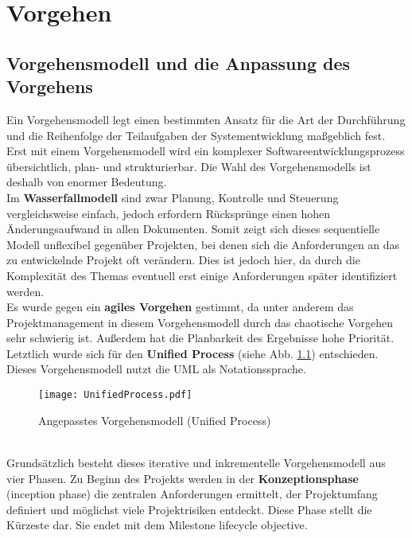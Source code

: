 \documentclass[../review_1.tex]{subfiles}
\begin{document}
\chapter{Vorgehen}\thispagestyle{fancy}
\section{Vorgehensmodell und die Anpassung des Vorgehens}
Ein Vorgehensmodell legt einen bestimmten Ansatz für die Art der Durchführung und die Reihenfolge der Teilaufgaben der Systementwicklung maßgeblich fest. Erst mit einem Vorgehensmodell wird ein komplexer Softwareentwicklungsprozess übersichtlich, plan- und strukturierbar. Die Wahl des Vorgehensmodells ist deshalb von enormer Bedeutung.\\
Im \textbf{Wasserfallmodell} sind zwar Planung, Kontrolle und Steuerung vergleichsweise einfach, jedoch erfordern Rücksprünge einen hohen Änderungsaufwand in allen Dokumenten. Somit zeigt sich dieses sequentielle Modell unflexibel gegenüber Projekten, bei denen sich die Anforderungen an das zu entwickelnde Projekt oft verändern. Dies ist jedoch hier, da durch die Komplexität des Themas eventuell erst einige Anforderungen später identifiziert werden. \\
Es wurde gegen ein \textbf{agiles Vorgehen} gestimmt, da unter anderem das Projektmanagement in diesem Vorgehensmodell durch das chaotische Vorgehen sehr schwierig ist. Außerdem hat die Planbarkeit des Ergebnisse hohe Priorität.\\
Letztlich wurde sich für den \textbf{Unified Process} (siehe Abb. \ref{up}) entschieden. Dieses Vorgehensmodell nutzt die UML als Notationssprache.
\vspace{-0.3cm}
\begin{figure} [h]
    \centering
    \texttt{[image: UnifiedProcess.pdf]}
    \caption{Angepasstes Vorgehensmodell (Unified Process)}
    \label{up}
\end{figure}
\\ \newline Grundsätzlich besteht dieses iterative und inkrementelle Vorgehensmodell aus vier Phasen. Zu Beginn des Projekts werden in der \textbf{Konzeptionsphase} (inception phase) die zentralen Anforderungen ermittelt, der Projektumfang definiert und möglichst viele Projektrisiken entdeckt. Diese Phase stellt die Kürzeste dar. Sie endet mit dem Milestone lifecycle objective.\\
\end{document}
